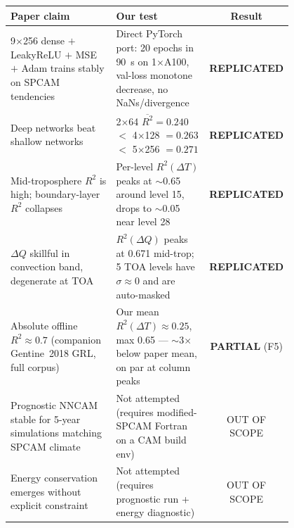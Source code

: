 \documentclass[11pt]{article}
\begin{document}
\begin{table}[h]
\centering
\small
\begin{tabular}{p{0.45\linewidth}p{0.35\linewidth}c}
\toprule
Paper claim & Our test & Result \\
\midrule
9$\times$256 dense $+$ LeakyReLU $+$ MSE $+$ Adam trains stably on SPCAM tendencies
& Direct PyTorch port: 20 epochs in 90~s on 1$\times$A100, val-loss monotone decrease, no NaNs/divergence
& \textbf{REPLICATED} \\
\addlinespace
Deep networks beat shallow networks
& 2$\times$64 $\overline{R^2} = 0.240$ $<$ 4$\times$128 $= 0.263$ $<$ 5$\times$256 $= 0.271$
& \textbf{REPLICATED} \\
\addlinespace
Mid-troposphere $R^2$ is high; boundary-layer $R^2$ collapses
& Per-level $R^2(\Delta T)$ peaks at $\sim$0.65 around level 15, drops to $\sim$0.05 near level 28
& \textbf{REPLICATED} \\
\addlinespace
$\Delta Q$ skillful in convection band, degenerate at TOA
& $R^2(\Delta Q)$ peaks at 0.671 mid-trop; 5 TOA levels have $\sigma \approx 0$ and are auto-masked
& \textbf{REPLICATED} \\
\addlinespace
Absolute offline $R^2 \approx 0.7$ (companion Gentine~2018 GRL, full corpus)
& Our mean $R^2(\Delta T) \approx 0.25$, max 0.65 --- $\sim$3$\times$ below paper mean, on par at column peaks
& \textbf{PARTIAL} (F5) \\
\addlinespace
Prognostic NNCAM stable for 5-year simulations matching SPCAM climate
& Not attempted (requires modified-SPCAM Fortran on a CAM build env)
& OUT OF SCOPE \\
\addlinespace
Energy conservation emerges without explicit constraint
& Not attempted (requires prognostic run + energy diagnostic)
& OUT OF SCOPE \\
\bottomrule
\end{tabular}
\end{table}
\end{document}
